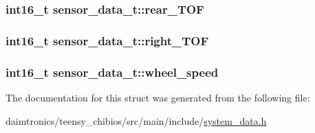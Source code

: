 \subsubsection[{\texorpdfstring{rear\+\_\+\+T\+OF}{rear_TOF}}]{\setlength{\rightskip}{0pt plus 5cm}int16\+\_\+t sensor\+\_\+data\+\_\+t\+::rear\+\_\+\+T\+OF}\hypertarget{structsensor__data__t_a8edb05e5c8377d9faf2b12e4e3250c6c}{}\label{structsensor__data__t_a8edb05e5c8377d9faf2b12e4e3250c6c}
\subsubsection[{\texorpdfstring{right\+\_\+\+T\+OF}{right_TOF}}]{\setlength{\rightskip}{0pt plus 5cm}int16\+\_\+t sensor\+\_\+data\+\_\+t\+::right\+\_\+\+T\+OF}\hypertarget{structsensor__data__t_a0a5ace9e72835c96a0620b148309df1e}{}\label{structsensor__data__t_a0a5ace9e72835c96a0620b148309df1e}
\subsubsection[{\texorpdfstring{wheel\+\_\+speed}{wheel_speed}}]{\setlength{\rightskip}{0pt plus 5cm}int16\+\_\+t sensor\+\_\+data\+\_\+t\+::wheel\+\_\+speed}\hypertarget{structsensor__data__t_a9bf1052ed7b8733732b86a5514bffa67}{}\label{structsensor__data__t_a9bf1052ed7b8733732b86a5514bffa67}


The documentation for this struct was generated from the following file\+:\begin{DoxyCompactItemize}
\item 
daimtronics/teensy\+\_\+chibios/src/main/include/\hyperlink{teensy__chibios_2src_2main_2include_2system__data_8h}{system\+\_\+data.\+h}\end{DoxyCompactItemize}

